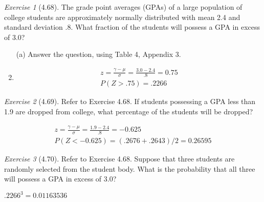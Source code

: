 \documentclass[12pt]{amsart}
\makeatletter
\theoremstyle{remark}
\newtheorem*{exercise}{Exercise}%
\renewenvironment{proof}[1][\proofname]{\par\doublespacing
  \pushQED{\qed}%
  \normalfont \topsep6\p@\@plus6\p@\relax
  \list{}{%
    \settowidth{\leftmargin}{\itshape\proofname:\hskip\labelsep}%
    \setlength{\labelwidth}{0pt}%
    \setlength{\itemindent}{-\leftmargin}%
  }%
  \item[\hskip\labelsep\itshape#1\@addpunct{:}]\ignorespaces
}{%
  \popQED\endlist\@endpefalse
  \singlespacing
}
\theoremstyle{mycomment}
\makeatother
\begin{document}
\begin{exercise}[4.68]
The grade point averages (GPAs) of a large population of college students are approximately normally distributed with mean 2.4 and standard deviation .8. What fraction of the students will possess a GPA in excess of 3.0?

\begin{enumerate}
    \item[(a)] Answer the question, using Table 4, Appendix 3.
\begin{proof}[Solution]
	\begin{align*}
		z = \frac{\gamma - \mu}{\sigma} = \frac{3.0 - 2.4}{.8} = 0.75 \\
		P(Z > .75) = .2266
	\end{align*}
\end{proof}
\end{enumerate}
\end{exercise}

\begin{exercise}[4.69]
Refer to Exercise 4.68. If students possessing a GPA less than 1.9 are dropped from college, what percentage of the students will be dropped?

\begin{proof}[Solution]
 \begin{align*}
	 z = \frac{\gamma - \mu}{\sigma} = \frac{1.9 - 2.4}{.8} = -0.625 \\
	 P(Z < -0.625) = (.2676 + .2643)/2 = 0.26595
 \end{align*}
\end{proof}
\end{exercise}

\begin{exercise}[4.70]
Refer to Exercise 4.68. Suppose that three students are randomly selected from the student body. What is the probability that all three will possess a GPA in excess of 3.0?

\begin{proof}[Solution]
$.2266^3 = 0.01163536$ 
\end{proof}
\end{exercise}
\end{document}
